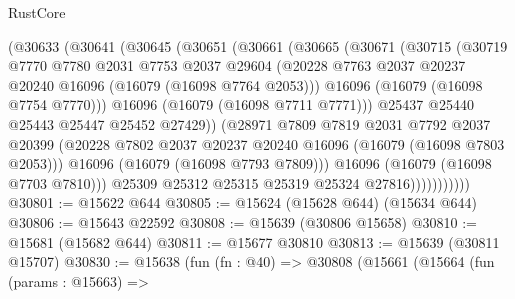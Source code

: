 \begin{lexlean}{RustCore}
\begin{coremodule}
                  (@30633
                    (@30641
                      (@30645
                        (@30651
                          (@30661
                            (@30665
                              (@30671
                                (@30715
                                  (@30719
                                    @7770
                                    @7780
                                    @2031
                                    @7753
                                    @2037
                                    @29604
                                    (@20228
                                      @7763
                                      @2037
                                      @20237
                                      @20240
                                      @16096
                                      (@16079 (@16098 @7764 @2053)))
                                    @16096
                                    (@16079 (@16098 @7754 @7770)))
                                  @16096
                                  (@16079 (@16098 @7711 @7771)))
                                @25437
                                @25440
                                @25443
                                @25447
                                @25452
                                @27429))
                            (@28971
                              @7809
                              @7819
                              @2031
                              @7792
                              @2037
                              @20399
                              (@20228
                                @7802
                                @2037
                                @20237
                                @20240
                                @16096
                                (@16079 (@16098 @7803 @2053)))
                              @16096
                              (@16079 (@16098 @7793 @7809)))
                            @16096
                            (@16079 (@16098 @7703 @7810)))
                          @25309
                          @25312
                          @25315
                          @25319
                          @25324
                          @27816)))))))))))
@30801 := @15622 @644
@30805 := @15624 (@15628 @644) (@15634 @644)
@30806 := @15643 @22592
@30808 := @15639 (@30806 @15658)
@30810 := @15681 (@15682 @644)
@30811 := @15677 @30810
@30813 := @15639 (@30811 @15707)
@30830 := @15638
    (fun (fn : @40) =>
    @30808
      (@15661
        (@15664
          (fun (params : @15663) =>

\end{coremodule}
\end{lexlean}

